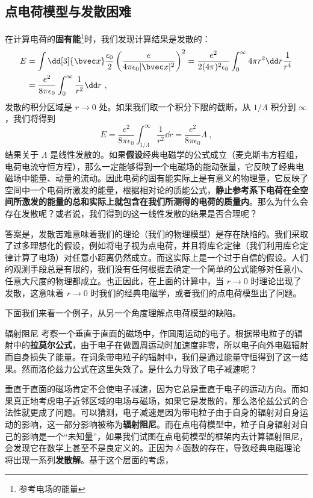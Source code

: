 
\subsection{点电荷模型与发散困难}
在计算电荷的\textbf{固有能}\footnote{参考电场的能量}时，我们发现计算结果是发散的：
\begin{equation}\label{eq_elecdb_1}
\begin{aligned}
E&=\int \dd[3]{\bvec x}\frac{\epsilon_0}{2} \left(\frac{e}{4\pi\epsilon_0 |\bvec x|^2}\right)^2=\frac{e^2}{2(4\pi)^2\epsilon_0}\int_0^\infty 4\pi r^2\dd r \frac{1}{r^4}\\
&=\frac{e^2}{8\pi\epsilon_0} \int_0^\infty \frac{1}{r^2}\dd r~,
\end{aligned}
\end{equation}
发散的积分区域是 $r\rightarrow 0$ 处。如果我们取一个积分下限的截断，从 $1/\Lambda$ 积分到 $\infty$，我们将得到
\begin{equation}
E=\frac{e^2}{8\pi\epsilon_0}\int_{1/\Lambda}^{\infty} \frac{1}{r^2}\dd r=\frac{e^2}{8\pi\epsilon_0}\Lambda~,
\end{equation}
结果关于 $\Lambda$ 是线性发散的。如果\textbf{假设}经典电磁学的公式成立（麦克斯韦方程组，电荷电流守恒方程），那么一定能够得到一个电磁场的能动张量，它反映了经典电磁场中能量、动量的流动。因此电荷的固有能实际上是有意义的物理量，它反映了空间中一个电荷所激发的能量，根据相对论的质能公式，\textbf{静止参考系下电荷在全空间所激发的能量的总和实际上就包含在我们所测得的电荷的质量内}。那么为什么会存在发散呢？或者说，我们得到的这一线性发散的结果是否合理呢？

答案是，发散苦难意味着我们的理论（我们的物理模型）是存在缺陷的。我们采取了过多理想化的假设，例如将电子视为点电荷，并且将库仑定律（我们利用库仑定律计算了电场）对任意小距离仍然成立。而这实际上是一个过于自信的假设。人们的观测手段总是有限的，我们没有任何根据去确定一个简单的公式能够对任意小、任意大尺度的物理都成立。也正因此，在上面的计算中，当 $r\rightarrow 0$ 时理论出现了发散，这意味着 $r\rightarrow 0$ 时我们的经典电磁学，或者我们的点电荷模型出了问题。

下面我们来看一个例子，从另一个角度理解点电荷模型的缺陷。
\begin{example}{辐射阻尼}
考察一个垂直于直面的磁场中，作圆周运动的电子。根据带电粒子的辐射中的\textbf{拉莫尔公式}，由于电子在做圆周运动时加速度非零，所以电子向外电磁辐射而自身损失了能量。在词条带电粒子的辐射中，我们是通过能量守恒得到了这一结果。然而洛伦兹力公式在这里失效了。是什么力导致了电子减速呢？
\end{example}
垂直于直面的磁场肯定不会使电子减速，因为它总是垂直于电子的运动方向。而如果真正地考虑电子近邻区域的电场与磁场，如果它是发散的，那么洛伦兹公式的合法性就更成了问题。可以猜测，电子减速是因为带电粒子由于自身的辐射对自身运动的影响，这一部分影响被称为\textbf{辐射阻尼}。而在点电荷模型中，粒子自身辐射对自己的影响是一个“未知量”，如果我们试图在点电荷模型的框架内去计算辐射阻尼，会发现它在数学上甚至不是良定义的。正因为 $\delta$-函数的存在，导致经典电磁理论将出现一系列\textbf{发散解}。基于这个层面的考虑，

